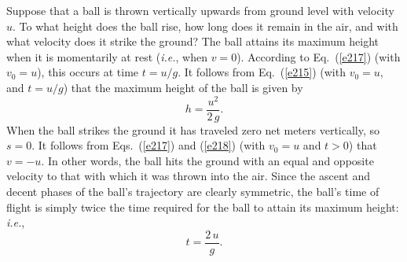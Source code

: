 Suppose that a ball is thrown vertically upwards from ground level with velocity $u$. 
To what height does the ball rise, 
how
long does it remain in the air, and with what velocity does it strike the
ground? The ball attains its maximum height when it is momentarily at rest
({\em i.e.}, when $v=0$). According to Eq.~(\ref{e217}) (with $v_0=u$), 
this occurs at time $t=u/g$. It follows from Eq.~(\ref{e215}) (with
$v_0=u$,  and $t=u/g$) that the maximum height of the ball
is given by
\begin{equation}
h = \frac{u^2}{2\,g}.
\end{equation} 
When the ball strikes the ground it has traveled zero net meters vertically, so $s=0$.
It follows from   Eqs.~(\ref{e217}) and (\ref{e218}) (with $v_0=u$ and $t>0$) that $v=-u$. 
In other words, the ball hits the ground with an equal and opposite velocity to that
with
which it was thrown into the air. Since the ascent and decent phases of the ball's
trajectory are clearly symmetric, the ball's time of flight is
simply twice the time required for the ball to attain its maximum height:
{\em i.e.},
\begin{equation}
t = \frac{2\,u}{g}.
\end{equation}

